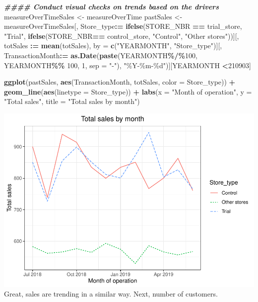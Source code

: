 \documentclass[
]{article}
\newenvironment{Shaded}{\begin{snugshade}}{\end{snugshade}}
\newcommand{\AttributeTok}[1]{\textcolor[rgb]{0.13,0.29,0.53}{#1}}
\newcommand{\DecValTok}[1]{\textcolor[rgb]{0.00,0.00,0.81}{#1}}
\newcommand{\DocumentationTok}[1]{\textcolor[rgb]{0.56,0.35,0.01}{\textbf{\textit{#1}}}}
\newcommand{\FunctionTok}[1]{\textcolor[rgb]{0.13,0.29,0.53}{\textbf{#1}}}
\newcommand{\NormalTok}[1]{#1}
\newcommand{\OtherTok}[1]{\textcolor[rgb]{0.56,0.35,0.01}{#1}}
\newcommand{\SpecialCharTok}[1]{\textcolor[rgb]{0.81,0.36,0.00}{\textbf{#1}}}
\newcommand{\StringTok}[1]{\textcolor[rgb]{0.31,0.60,0.02}{#1}}
\begin{document}
\begin{Shaded}
\begin{Highlighting}[]
\DocumentationTok{\#\#\#\# Conduct visual checks on trends based on the drivers}
\NormalTok{measureOverTimeSales }\OtherTok{\textless{}{-}}\NormalTok{ measureOverTime}
\NormalTok{pastSales }\OtherTok{\textless{}{-}}\NormalTok{ measureOverTimeSales[, Store\_type}\SpecialCharTok{:=} \FunctionTok{ifelse}\NormalTok{(STORE\_NBR }\SpecialCharTok{==}\NormalTok{ trial\_store, }\StringTok{"Trial"}\NormalTok{, }\FunctionTok{ifelse}\NormalTok{(STORE\_NBR}\SpecialCharTok{==}\NormalTok{ control\_store, }\StringTok{"Control"}\NormalTok{, }\StringTok{"Other stores"}\NormalTok{))][, totSales }\SpecialCharTok{:=} \FunctionTok{mean}\NormalTok{(totSales), by }\OtherTok{=} \FunctionTok{c}\NormalTok{(}\StringTok{"YEARMONTH"}\NormalTok{, }\StringTok{"Store\_type"}\NormalTok{)][, TransactionMonth}\SpecialCharTok{:=} \FunctionTok{as.Date}\NormalTok{(}\FunctionTok{paste}\NormalTok{(YEARMONTH}\SpecialCharTok{\%/\%}\DecValTok{100}\NormalTok{, YEARMONTH}\SpecialCharTok{\%\%} \DecValTok{100}\NormalTok{, }\DecValTok{1}\NormalTok{, }\AttributeTok{sep =} \StringTok{"{-}"}\NormalTok{), }\StringTok{"\%Y{-}\%m{-}\%d"}\NormalTok{)][YEARMONTH }\SpecialCharTok{\textless{}}\DecValTok{210903}\NormalTok{] }

\FunctionTok{ggplot}\NormalTok{(pastSales, }\FunctionTok{aes}\NormalTok{(TransactionMonth, totSales, }\AttributeTok{color =}\NormalTok{ Store\_type)) }\SpecialCharTok{+}
  \FunctionTok{geom\_line}\NormalTok{(}\FunctionTok{aes}\NormalTok{(}\AttributeTok{linetype =}\NormalTok{ Store\_type)) }\SpecialCharTok{+}
  \FunctionTok{labs}\NormalTok{(}\AttributeTok{x =} \StringTok{"Month of operation"}\NormalTok{, }\AttributeTok{y =} \StringTok{"Total sales"}\NormalTok{, }\AttributeTok{title =} \StringTok{"Total sales by month"}\NormalTok{)}
\end{Highlighting}
\end{Shaded}

\includegraphics{InsideSherpa_Task2_files/figure-latex/unnamed-chunk-17-1.pdf}
Great, sales are trending in a similar way. Next, number of customers.
\end{document}
